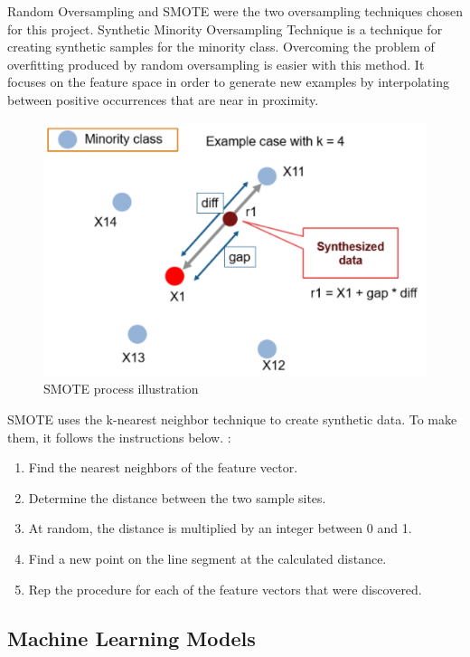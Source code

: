 Random Oversampling and SMOTE were the two oversampling techniques chosen for this project. Synthetic Minority Oversampling Technique is a technique for creating synthetic samples for the minority class. Overcoming the problem of overfitting produced by random oversampling is easier with this method. It focuses on the feature space in order to generate new examples by interpolating between positive occurrences that are near in proximity.

\begin{figure}[H]
\centering
\includegraphics[scale=0.7]{img/SMOTE.PNG}
\caption{SMOTE process illustration}
\label{fig:smoteproc}
\end{figure}

SMOTE uses the k-nearest neighbor technique to create synthetic data. To make them, it follows the instructions below. \cite{smote1}:

\begin{enumerate}
    \item Find the nearest neighbors of the feature vector.
    \item Determine the distance between the two sample sites.
    \item At random, the distance is multiplied by an integer between 0 and 1.
    \item Find a new point on the line segment at the calculated distance.
    \item Rep the procedure for each of the feature vectors that were discovered.
\end{enumerate}

\subsection{Machine Learning Models} \label{3mlmodels}

